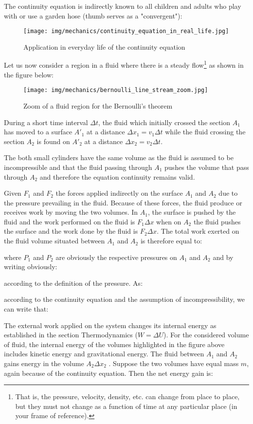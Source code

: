 	The continuity equation is indirectly known to all children and adults who play with or use a garden hose (thumb serves as a "convergent"):
	\begin{figure}[H]
		\centering
		\texttt{[image: img/mechanics/continuity\_equation\_in\_real\_life.jpg]}
		\caption{Application in everyday life of the continuity equation}
	\end{figure}
	Let us now consider a region in a fluid where there is a steady flow\footnote{That is, the pressure, velocity, density, etc. can change from place to place, but they must not change as a function of time at any particular place (in your frame of reference).} as shown in the figure below:
	\begin{figure}[H]
		\centering
		\texttt{[image: img/mechanics/bernoulli\_line\_stream\_zoom.jpg]}
		\caption{Zoom of a fluid region for the Bernoulli's theorem}
	\end{figure}
	During a short time interval $\Delta t$, the fluid which initially crossed the section $A_1$ has moved to a surface ${A'}_1$ at a distance $\Delta x_1=v_1\Delta t$ while the fluid crossing the section $A_2$ is found on ${A'}_2$ at a distance $\Delta x_2=v_2\Delta t$. 

	The both small cylinders have the same volume as the fluid is assumed to be incompressible and that the fluid passing through $A_1$ pushes the volume that pass through $A_2$ and therefore the equation continuity remains valid.
	
	Given $F_1$ and $F_2$ the forces applied indirectly on the surface $A_1$ and $A_2$ due to the pressure prevailing in the fluid. Because of these forces, the fluid produce or receives work by moving the two volumes. In $A_1$, the surface is pushed by the fluid and the work performed on the fluid is $F_1\Delta x$ when on $A_2$ the fluid pushes the surface and the work done by the fluid is $F_2\Delta x$. The total work exerted on the fluid volume situated between $A_1$ and $A_2$ is therefore equal to:
		
	where $P_1$ and $P_2$ are obviously the respective pressures on $A_1$ and $A_2$ and by writing obviously:	
	
	according to the definition of the pressure. As:
	
	according to the continuity equation and the assumption of incompressibility, we can write that:
	
	The external work applied on the system changes its internal energy as established in the section Thermodynamics ($W=\Delta U$). For the considered volume of fluid, the internal energy of the volumes highlighted  in the figure above includes kinetic energy and gravitational energy. The fluid between $A_1$ and $A_2$ gains energy in the volume $A_2\Delta x_2$ . Suppose the two volumes have equal mass $m$, again because of the continuity equation. Then the net energy gain is:
	
